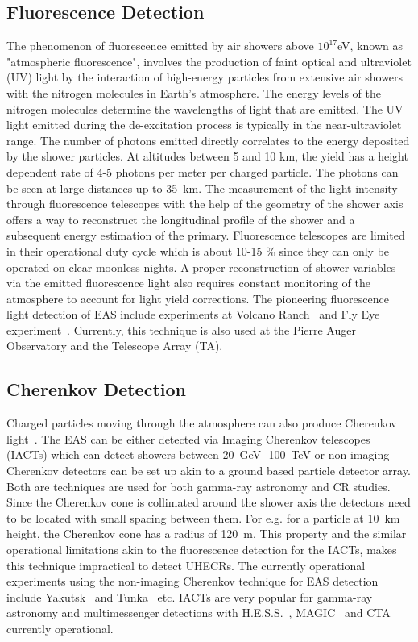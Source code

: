\subsection{Fluorescence Detection}
\label{sec:EAS_flu}
The phenomenon of fluorescence emitted by air showers above $10^{17}$eV, known as "atmospheric fluorescence", involves the production of faint optical and ultraviolet (UV) light by the interaction of high-energy particles from extensive air showers with the nitrogen molecules in Earth's atmosphere. The energy levels of the nitrogen molecules determine the wavelengths of light that are emitted. The UV light emitted during the de-excitation process is typically in the near-ultraviolet range. The number of photons emitted directly correlates to the energy deposited by the shower particles. At altitudes between 5 and 10 km, the yield has a height dependent rate of 4-5 photons per meter per charged particle. The photons can be seen at large distances up to 35 km. The measurement of the light intensity through fluorescence telescopes with the help of the geometry of the shower axis offers a way to reconstruct the longitudinal profile of the shower and a subsequent energy estimation of the primary. Fluorescence telescopes are limited in their operational duty cycle which is about 10-15 \% since they can only be operated on clear moonless nights. A proper reconstruction of shower variables via the emitted fluorescence light also requires constant monitoring of the atmosphere to account for light yield corrections. The pioneering fluorescence light detection of EAS include experiments at Volcano Ranch~\cite{1977PhRvL..39..847B} and Fly Eye experiment~\cite{BALTRUSAITIS1985410,BALTRUSAITIS198887}. Currently, this technique is also used at the Pierre Auger Observatory and the Telescope Array (TA).


\subsection{Cherenkov Detection}
\label{sec:EAS_cher}
Charged particles moving through the atmosphere can also produce Cherenkov light~\cite{Cherenkov:1934ilx}. The EAS can be either detected via Imaging Cherenkov telescopes (IACTs) which can detect showers between 20 GeV -100 TeV or non-imaging Cherenkov detectors can be set up akin to a ground based particle detector array. Both are techniques are used for both gamma-ray astronomy and CR studies. Since the Cherenkov cone is collimated around the shower axis the detectors need to be located with small spacing between them. For e.g. for a particle at 10 km height, the Cherenkov cone has a radius of 120 m. This property and the similar operational limitations akin to the fluorescence detection for the IACTs, makes this technique impractical to detect UHECRs. The currently operational experiments using the non-imaging Cherenkov technique for EAS detection include Yakutsk~\cite{DYAKONOV1986224} and Tunka~\cite{KUZMICHEV2020161830} etc. IACTs are very popular for gamma-ray astronomy and multimessenger detections with H.E.S.S.~\cite{Puhlhofer:2024fjx}, MAGIC~\cite{cortina2009technicalperformancemagictelescopes} and CTA~\cite{2018_CTAO} currently operational. 

